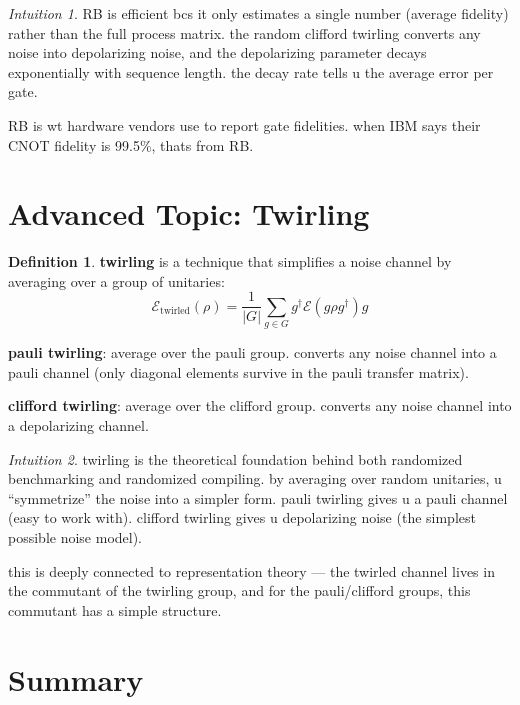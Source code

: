 \documentclass[11pt,a4paper]{article}
\theoremstyle{definition}
\newtheorem{definition}{Definition}[section]
\theoremstyle{remark}
\newtheorem*{intuition}{Intuition}
\begin{document}
\begin{intuition}
RB is efficient bcs it only estimates a single number (average fidelity) rather than the full process matrix. the random clifford twirling converts any noise into depolarizing noise, and the depolarizing parameter decays exponentially with sequence length. the decay rate tells u the average error per gate.

RB is wt hardware vendors use to report gate fidelities. when IBM says their CNOT fidelity is 99.5\%, thats from RB.
\end{intuition}

\section{Advanced Topic: Twirling}

\begin{definition}
\textbf{twirling} is a technique that simplifies a noise channel by averaging over a group of unitaries:
\[
\mathcal{E}_{\text{twirled}}(\rho) = \frac{1}{|G|}\sum_{g \in G} g^\dagger \mathcal{E}(g \rho g^\dagger) g
\]

\textbf{pauli twirling}: average over the pauli group. converts any noise channel into a pauli channel (only diagonal elements survive in the pauli transfer matrix).

\textbf{clifford twirling}: average over the clifford group. converts any noise channel into a depolarizing channel.
\end{definition}

\begin{intuition}
twirling is the theoretical foundation behind both randomized benchmarking and randomized compiling. by averaging over random unitaries, u ``symmetrize'' the noise into a simpler form. pauli twirling gives u a pauli channel (easy to work with). clifford twirling gives u depolarizing noise (the simplest possible noise model).

this is deeply connected to representation theory --- the twirled channel lives in the commutant of the twirling group, and for the pauli/clifford groups, this commutant has a simple structure.
\end{intuition}

\section{Summary}
\end{document}
